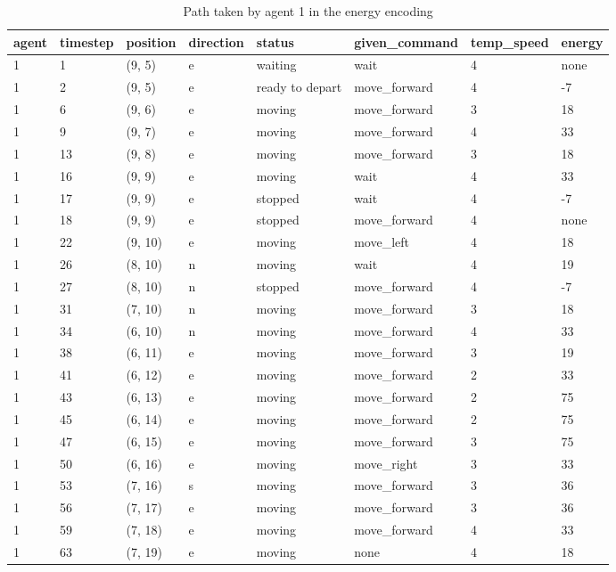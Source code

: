 \begin{table}[H]
  \centering
  \caption{Path taken by agent 1 in the energy encoding}
  \label{tab:energy1}
  \begin{tabular}{llllllll}
    \toprule
    agent & timestep & position & direction & status & given\_command & temp\_speed & energy \\
    \midrule
1 & 1 & (9, 5) & e & waiting & wait & 4 & none \\
1 & 2 & (9, 5) & e & ready to depart & move\_forward & 4 & -7 \\
1 & 6 & (9, 6) & e & moving & move\_forward & 3 & 18 \\
1 & 9 & (9, 7) & e & moving & move\_forward & 4 & 33 \\
1 & 13 & (9, 8) & e & moving & move\_forward & 3 & 18 \\
1 & 16 & (9, 9) & e & moving & wait & 4 & 33 \\
1 & 17 & (9, 9) & e & stopped & wait & 4 & -7 \\
1 & 18 & (9, 9) & e & stopped & move\_forward & 4 & none \\
1 & 22 & (9, 10) & e & moving & move\_left & 4 & 18 \\
1 & 26 & (8, 10) & n & moving & wait & 4 & 19 \\
1 & 27 & (8, 10) & n & stopped & move\_forward & 4 & -7 \\
1 & 31 & (7, 10) & n & moving & move\_forward & 3 & 18 \\
1 & 34 & (6, 10) & n & moving & move\_forward & 4 & 33 \\
1 & 38 & (6, 11) & e & moving & move\_forward & 3 & 19 \\
1 & 41 & (6, 12) & e & moving & move\_forward & 2 & 33 \\
1 & 43 & (6, 13) & e & moving & move\_forward & 2 & 75 \\
1 & 45 & (6, 14) & e & moving & move\_forward & 2 & 75 \\
1 & 47 & (6, 15) & e & moving & move\_forward & 3 & 75 \\
1 & 50 & (6, 16) & e & moving & move\_right & 3 & 33 \\
1 & 53 & (7, 16) & s & moving & move\_forward & 3 & 36 \\
1 & 56 & (7, 17) & e & moving & move\_forward & 3 & 36 \\
1 & 59 & (7, 18) & e & moving & move\_forward & 4 & 33 \\
1 & 63 & (7, 19) & e & moving & none & 4 & 18 \\
    \bottomrule
  \end{tabular}
\end{table}